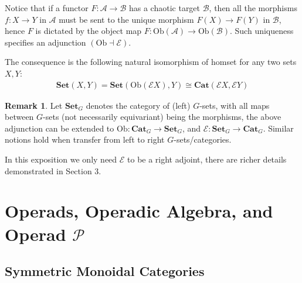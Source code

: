 \documentclass[openany, amssymb, psamsfonts]{amsart}
\theoremstyle{definition}
\newtheorem{rem}{Remark}[section]
\numberwithin{equation}{section}
\newcommand{\Cat}{\mathbf{Cat}} %
\newcommand{\Sets}{\mathbf{Set}} %
\newcommand{\cP}{\mathscr{P}} %
\newcommand{\A}{\mathscr{A}}
\newcommand{\B}{\mathscr{B}}
\newcommand{\Ob}{\mathrm{Ob}}%
\begin{document}
Notice that if a functor $F:\A\rightarrow\B$ has a chaotic target $\B$, then all the morphisms $f:X\rightarrow Y$ in $\A$ must be sent to the unique morphism $F(X)\rightarrow F(Y)$ in $\B$, hence $F$ is dictated by the object map $F:\Ob(\A)\rightarrow\Ob(\B)$. Such uniqueness specifies an adjunction $(\Ob\dashv \mathscr{E})$.

The consequence is the following natural isomorphism of homset for any two sets $X,Y$:
\begin{align}
    \Sets(X,Y)=\Sets(\Ob(\mathscr{E}X),Y)\cong \Cat(\mathscr{E}X,\mathscr{E}Y)
\end{align}

\begin{rem}\label{rem_equiv_chaot}
    Let $\Sets_G$ denotes the category of (left) $G$-sets, with all maps between $G$-sets (not necessarily equivariant) being the morphisms, the above adjunction can be extended to $\Ob:\Cat_G\rightarrow \Sets_G$, and $\mathscr{E}:\Sets_G\rightarrow\Cat_G$. Similar notions hold when transfer from left to right $G$-sets/categories.
\end{rem}

In this exposition we only need $\mathscr{E}$ to be a right adjoint, there are richer details demonstrated in \cite{GM17} Section 3.

\section{Operads, Operadic Algebra, and Operad $\cP$}\label{sec_operad}
\subsection{Symmetric Monoidal Categories}\label{sub_symmon}
\end{document}
